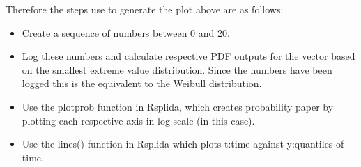 \documentclass{article}
\begin{document}
Therefore the steps use to generate the plot above are as follows:\\
\begin{itemize}
\item Create a sequence of numbers between 0 and 20.\\

\item Log these numbers and calculate respective PDF outputs for the vector based on the smallest extreme value distribution.  Since the numbers have been logged this is the equivalent to the Weibull distribution.

\item Use the plotprob function in Rsplida, which creates probability paper by plotting each respective axis in log-scale (in this case).

\item Use the lines() function in Rsplida which plots t:time against y:quantiles of time.
\end{itemize}
\end{document}
